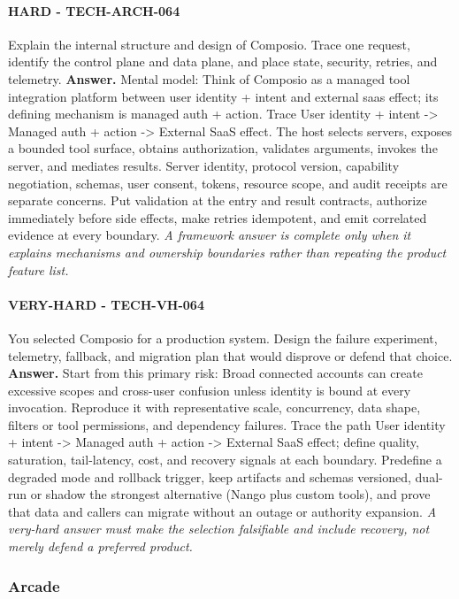 \paragraph{HARD - TECH-ARCH-064} Explain the internal structure and design of Composio. Trace one request, identify the control plane and data plane, and place state, security, retries, and telemetry.
\textbf{Answer.} Mental model: Think of Composio as a managed tool integration platform between user identity + intent and external saas effect; its defining mechanism is managed auth + action. Trace User identity + intent -> Managed auth + action -> External SaaS effect. The host selects servers, exposes a bounded tool surface, obtains authorization, validates arguments, invokes the server, and mediates results. Server identity, protocol version, capability negotiation, schemas, user consent, tokens, resource scope, and audit receipts are separate concerns. Put validation at the entry and result contracts, authorize immediately before side effects, make retries idempotent, and emit correlated evidence at every boundary.
\textit{A framework answer is complete only when it explains mechanisms and ownership boundaries rather than repeating the product feature list.}
\paragraph{VERY-HARD - TECH-VH-064} You selected Composio for a production system. Design the failure experiment, telemetry, fallback, and migration plan that would disprove or defend that choice.
\textbf{Answer.} Start from this primary risk: Broad connected accounts can create excessive scopes and cross-user confusion unless identity is bound at every invocation. Reproduce it with representative scale, concurrency, data shape, filters or tool permissions, and dependency failures. Trace the path User identity + intent -> Managed auth + action -> External SaaS effect; define quality, saturation, tail-latency, cost, and recovery signals at each boundary. Predefine a degraded mode and rollback trigger, keep artifacts and schemas versioned, dual-run or shadow the strongest alternative (Nango plus custom tools), and prove that data and callers can migrate without an outage or authority expansion.
\textit{A very-hard answer must make the selection falsifiable and include recovery, not merely defend a preferred product.}
\subsubsection*{Arcade}
